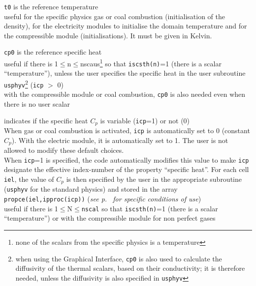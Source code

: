 {{\tt t0} is the reference temperature \\
useful for the specific physics gas or coal combustion (initialisation
of the density), for the electricity modules to initialise the domain
temperature and for the compressible module (initialisations). It must be given
in Kelvin.}

{{\tt cp0} is the reference specific heat\\
useful if there is 1$\leqslant$n$\leqslant$nscaus\footnote{none of the scalars
from the specific physics is a temperature} so that {\tt iscsth(n)}=1
(there is a scalar ``temperature''), unless the user specifies the
specific heat in the user subroutine \texttt{usphyv}\footnote{when using the
Graphical Interface, {\tt cp0} is also used to calculate the diffusivity of the
thermal scalars, based on their conductivity; it is therefore needed, unless the
diffusivity is also specified in \texttt{usphyv}} ({\tt icp} $>$ 0)\\
with the compressible module or coal combustion, {\tt cp0} is also needed even when
there is no user scalar}

{indicates if the specific heat $C_p$ is variable
({\tt icp}=1) or not (0)\\
When gas or coal combustion is activated, {\tt icp} is automatically set to 0
(constant $C_p$). With the electric module, it is automatically set to 1.
The user is not allowed to modify these default choices.\\
When {\tt icp}=1 is specified, the code automatically modifies this value to
make {\tt icp} designate the effective index-number of the property
``specific heat''. For each cell {\tt iel}, the value of
$C_p$ is then specified by the user in the appropriate subroutine
(\texttt{usphyv} for the standard physics) and stored in the array\\
{\tt propce(iel,ipproc(icp))}
({\em see p.~\pageref{sec:prg_propvar} for specific conditions of use})\\
useful if there is 1$\leqslant$N$\leqslant${\tt nscal} so that {\tt iscsth(n)}=1
(there is a scalar ``temperature'') or with the compressible module for non
perfect gases}

